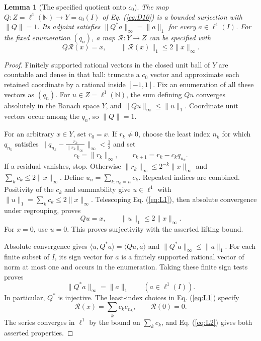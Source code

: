 \documentclass[11pt]{article}
\newcommand{\N}{\mathbb N}
\newcommand{\pair}[2]{\langle #1,#2\rangle}
\newtheorem{lemma}{Lemma}
\theoremstyle{definition}
\theoremstyle{remark}
\begin{document}
\begin{lemma}[The specified quotient onto $c_0$]
\label{lem:specified-quotient}
The map $Q:Z=\ell^1(\N)\to Y=c_0(I)$ of Eq. (\ref{eq:D10}) is a bounded surjection with $\|Q\|=1$. Its adjoint satisfies $\|Q^*a\|_\infty=\|a\|_1$ for every $a\in\ell^1(I)$. For the fixed enumeration $(q_n)$, a map $\mathcal R:Y\to Z$ can be specified with
\[
Q\mathcal R(x)=x,\qquad \|\mathcal R(x)\|_1\le2\|x\|_\infty.
\]
\end{lemma}
\begin{proof}
\label{sec:L1}
Finitely supported rational vectors in the closed unit ball of $Y$ are countable and dense in that ball: truncate a $c_0$ vector and approximate each retained coordinate by a rational inside $[-1,1]$. Fix an enumeration of all these vectors as $(q_n)$. For $u\in Z=\ell^1(\N)$, the sum defining $Qu$ converges absolutely in the Banach space $Y$, and $\|Qu\|_\infty\le\|u\|_1$. Coordinate unit vectors occur among the $q_n$, so $\|Q\|=1$.

For an arbitrary $x\in Y$, set $r_0=x$. If $r_k\ne0$, choose the least index $n_k$ for which $q_{n_k}$ satisfies $\|q_{n_k}-\frac{r_k}{\|r_k\|_\infty}\|_\infty<\frac{1}{2}$ and set
\begin{equation}
c_k=\|r_k\|_\infty,\qquad r_{k+1}=r_k-c_kq_{n_k}.
\label{eq:L1}
\end{equation}
If a residual vanishes, stop. Otherwise $\|r_k\|_\infty\le2^{-k}\|x\|_\infty$ and $\sum_k c_k\le2\|x\|_\infty$. Define $u_n=\sum_{k:n_k=n}c_k$. Repeated indices are combined. Positivity of the $c_k$ and summability give $u\in\ell^1$ with $\|u\|_1=\sum_k c_k\le2\|x\|_\infty$. Telescoping Eq. (\ref{eq:L1}), then absolute convergence under regrouping, proves
\begin{equation}
Qu=x,\qquad \|u\|_1\le2\|x\|_\infty.
\label{eq:L2}
\end{equation}
For $x=0$, use $u=0$. This proves surjectivity with the asserted lifting bound.

\label{sec:L2}
Absolute convergence gives $\pair{u}{Q^*a}=\pair{Qu}{a}$ and $\|Q^*a\|_\infty\le\|a\|_1$. For each finite subset of $I$, its sign vector for $a$ is a finitely supported rational vector of norm at most one and occurs in the enumeration. Taking these finite sign tests proves
\begin{equation}
\|Q^*a\|_\infty=\|a\|_1\qquad(a\in\ell^1(I)).
\label{eq:L3}
\end{equation}
In particular, $Q^*$ is injective. The least-index choices in Eq. (\ref{eq:L1}) specify
\[
\mathcal R(x)=\sum_k c_k e_{n_k},\qquad \mathcal R(0)=0.
\]
The series converges in $\ell^1$ by the bound on $\sum_k c_k$, and Eq. (\ref{eq:L2}) gives both asserted properties.
\end{proof}
\end{document}
